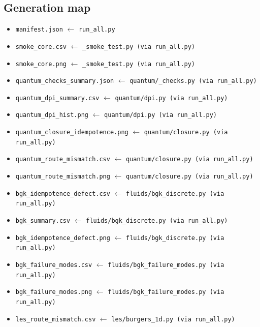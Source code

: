 \documentclass[11pt]{article}
\begin{document}
\subsection*{Generation map}
\small
\begin{itemize}[leftmargin=*,itemsep=0pt]
  \item {\footnotesize \texttt{manifest.json} $\leftarrow$ \texttt{run\_all.py}}
  \item {\footnotesize \texttt{smoke\_core.csv} $\leftarrow$ \texttt{\_smoke\_test.py (via run\_all.py)}}
  \item {\footnotesize \texttt{smoke\_core.png} $\leftarrow$ \texttt{\_smoke\_test.py (via run\_all.py)}}
  \item {\footnotesize \texttt{quantum\_checks\_summary.json} $\leftarrow$ \texttt{quantum/\_checks.py (via run\_all.py)}}
  \item {\footnotesize \texttt{quantum\_dpi\_summary.csv} $\leftarrow$ \texttt{quantum/dpi.py (via run\_all.py)}}
  \item {\footnotesize \texttt{quantum\_dpi\_hist.png} $\leftarrow$ \texttt{quantum/dpi.py (via run\_all.py)}}
  \item {\footnotesize \texttt{quantum\_closure\_idempotence.png} $\leftarrow$ \texttt{quantum/closure.py (via run\_all.py)}}
  \item {\footnotesize \texttt{quantum\_route\_mismatch.csv} $\leftarrow$ \texttt{quantum/closure.py (via run\_all.py)}}
  \item {\footnotesize \texttt{quantum\_route\_mismatch.png} $\leftarrow$ \texttt{quantum/closure.py (via run\_all.py)}}
  \item {\footnotesize \texttt{bgk\_idempotence\_defect.csv} $\leftarrow$ \texttt{fluids/bgk\_discrete.py (via run\_all.py)}}
  \item {\footnotesize \texttt{bgk\_summary.csv} $\leftarrow$ \texttt{fluids/bgk\_discrete.py (via run\_all.py)}}
  \item {\footnotesize \texttt{bgk\_idempotence\_defect.png} $\leftarrow$ \texttt{fluids/bgk\_discrete.py (via run\_all.py)}}
  \item {\footnotesize \texttt{bgk\_failure\_modes.csv} $\leftarrow$ \texttt{fluids/bgk\_failure\_modes.py (via run\_all.py)}}
  \item {\footnotesize \texttt{bgk\_failure\_modes.png} $\leftarrow$ \texttt{fluids/bgk\_failure\_modes.py (via run\_all.py)}}
  \item {\footnotesize \texttt{les\_route\_mismatch.csv} $\leftarrow$ \texttt{les/burgers\_1d.py (via run\_all.py)}}

\end{itemize}
\end{document}
